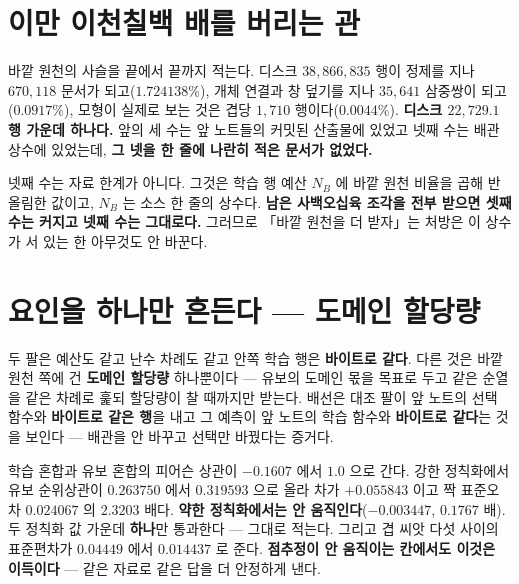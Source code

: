 \section{이만 이천칠백 배를 버리는 관}


바깥 원천의 사슬을 끝에서 끝까지 적는다. 디스크 $38{,}866{,}835$ 행이 정제를 지나 $670{,}118$ 문서가 되고($1.724138\%$), 개체 연결과 창 덮기를 지나 $35{,}641$ 삼중쌍이 되고($0.0917\%$), 모형이 실제로 보는 것은 겹당 $1{,}710$ 행이다($0.0044\%$). \textbf{디스크 $22{,}729.1$ 행 가운데 하나다.} 앞의 세 수는 앞 노트들의 커밋된 산출물에 있었고 넷째 수는 배관 상수에 있었는데, \textbf{그 넷을 한 줄에 나란히 적은 문서가 없었다.}

넷째 수는 자료 한계가 아니다. 그것은 학습 행 예산 $N_B$ 에 바깥 원천 비율을 곱해 반올림한 값이고, $N_B$ 는 소스 한 줄의 상수다. \textbf{남은 사백오십육 조각을 전부 받으면 셋째 수는 커지고 넷째 수는 그대로다.} 그러므로 「바깥 원천을 더 받자」는 처방은 이 상수가 서 있는 한 아무것도 안 바꾼다.

\section{요인을 하나만 흔든다 --- 도메인 할당량}


두 팔은 예산도 같고 난수 차례도 같고 안쪽 학습 행은 \textbf{바이트로 같다}. 다른 것은 바깥 원천 쪽에 건 \textbf{도메인 할당량} 하나뿐이다 --- 유보의 도메인 몫을 목표로 두고 같은 순열을 같은 차례로 훑되 할당량이 찰 때까지만 받는다. 배선은 대조 팔이 앞 노트의 선택 함수와 \textbf{바이트로 같은 행}을 내고 그 예측이 앞 노트의 학습 함수와 \textbf{바이트로 같다}는 것을 보인다 --- 배관을 안 바꾸고 선택만 바꿨다는 증거다.

학습 혼합과 유보 혼합의 피어슨 상관이 $-0.1607$ 에서 $1.0$ 으로 간다. 강한 정칙화에서 유보 순위상관이 $0.263750$ 에서 $0.319593$ 으로 올라 차가 $+0.055843$ 이고 짝 표준오차 $0.024067$ 의 $2.3203$ 배다. \textbf{약한 정칙화에서는 안 움직인다}($-0.003447$, $0.1767$ 배). 두 정칙화 값 가운데 \textbf{하나}만 통과한다 --- 그대로 적는다. 그리고 겹 씨앗 다섯 사이의 표준편차가 $0.04449$ 에서 $0.014437$ 로 준다. \textbf{점추정이 안 움직이는 칸에서도 이것은 이득이다} --- 같은 자료로 같은 답을 더 안정하게 낸다.

